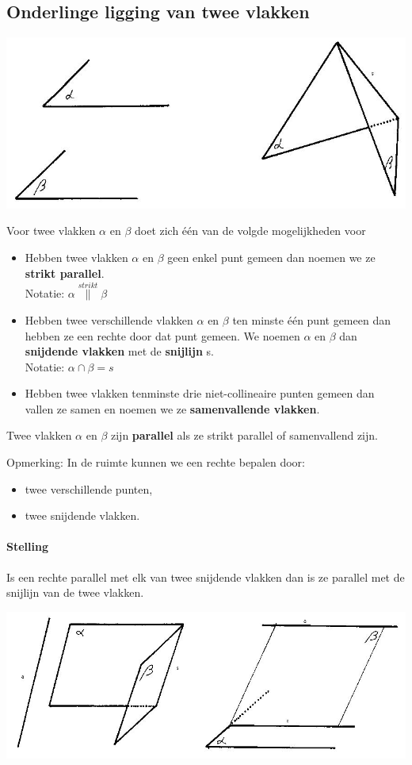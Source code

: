 \documentclass[12pt,twoside]{article}
\begin{document}
\begin{theorie}

\subsection{Onderlinge ligging van twee vlakken}

\begin{center}
  \includegraphics[width=.7\textwidth]{onderlinge_ligging_twee_vlakken}
\end{center}

Voor twee vlakken $\alpha$ en $\beta$ doet zich één van de volgde mogelijkheden voor
\begin{itemize}
  \item Hebben twee vlakken $\alpha$ en $\beta$ geen enkel punt gemeen dan noemen we ze {\bf strikt parallel}.\\
  Notatie: $\alpha \overset{strikt}{\parallel}\beta$
  \item Hebben twee verschillende vlakken $\alpha$ en $\beta$ ten minste één punt gemeen dan hebben ze een rechte door dat punt gemeen. We noemen $\alpha$ en $\beta$ dan {\bf snijdende vlakken} met de {\bf snijlijn} s.\\
  Notatie: $\alpha \cap \beta = s$
  \item Hebben twee vlakken tenminste drie niet-collineaire punten gemeen dan vallen ze samen en noemen we ze {\bf samenvallende vlakken}.
\end{itemize}

Twee vlakken $\alpha$ en $\beta$ zijn {\bf parallel} als ze strikt parallel of samenvallend zijn.

Opmerking: In de ruimte kunnen we een rechte bepalen door:
\begin{itemize}
  \item twee verschillende punten,
  \item twee snijdende vlakken.
\end{itemize}

\paragraph*{Stelling}
Is een rechte parallel met elk van twee snijdende vlakken dan is ze parallel met de snijlijn van de twee vlakken.
\begin{center}
  \includegraphics[width=.7\textwidth]{stelling_8}
\end{center}


\end{theorie}
\end{document}
